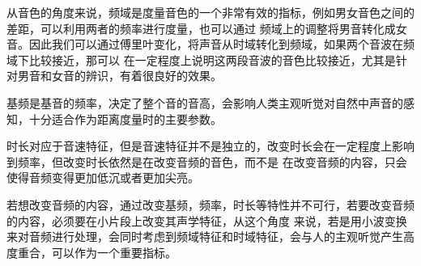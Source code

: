 \documentclass{ctexart}
\begin{document}
从音色的角度来说，频域是度量音色的一个非常有效的指标，例如男女音色之间的差距，可以利用两者的频率进行度量，也可以通过
频域上的调整将男音转化成女音。因此我们可以通过傅里叶变化，将声音从时域转化到频域，如果两个音波在频域下比较接近，那可以
在一定程度上说明这两段音波的音色比较接近，尤其是针对男音和女音的辨识，有着很良好的效果。

基频是基音的频率，决定了整个音的音高，会影响人类主观听觉对自然中声音的感知，十分适合作为距离度量时的主要参数。

时长对应于音速特征，但是音速特征并不是独立的，改变时长会在一定程度上影响到频率，但改变时长依然是在改变音频的音色，而不是
在改变音频的内容，只会使得音频变得更加低沉或者更加尖亮。

若想改变音频的内容，通过改变基频，频率，时长等特性并不可行，若要改变音频的内容，必须要在小片段上改变其声学特征，从这个角度
来说，若是用小波变换来对音频进行处理，会同时考虑到频域特征和时域特征，会与人的主观听觉产生高度重合，可以作为一个重要指标。
\end{document}
